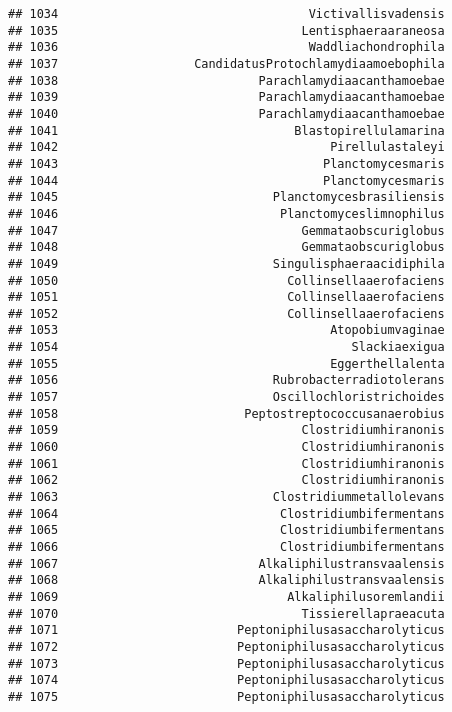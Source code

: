 \documentclass[
]{article}
\begin{document}
\begin{verbatim}
## 1034                                   Victivallisvadensis
## 1035                                  Lentisphaeraaraneosa
## 1036                                   Waddliachondrophila
## 1037                   CandidatusProtochlamydiaamoebophila
## 1038                            Parachlamydiaacanthamoebae
## 1039                            Parachlamydiaacanthamoebae
## 1040                            Parachlamydiaacanthamoebae
## 1041                                 Blastopirellulamarina
## 1042                                      Pirellulastaleyi
## 1043                                     Planctomycesmaris
## 1044                                     Planctomycesmaris
## 1045                              Planctomycesbrasiliensis
## 1046                               Planctomyceslimnophilus
## 1047                                  Gemmataobscuriglobus
## 1048                                  Gemmataobscuriglobus
## 1049                              Singulisphaeraacidiphila
## 1050                                Collinsellaaerofaciens
## 1051                                Collinsellaaerofaciens
## 1052                                Collinsellaaerofaciens
## 1053                                      Atopobiumvaginae
## 1054                                         Slackiaexigua
## 1055                                      Eggerthellalenta
## 1056                              Rubrobacterradiotolerans
## 1057                              Oscillochloristrichoides
## 1058                          Peptostreptococcusanaerobius
## 1059                                  Clostridiumhiranonis
## 1060                                  Clostridiumhiranonis
## 1061                                  Clostridiumhiranonis
## 1062                                  Clostridiumhiranonis
## 1063                              Clostridiummetallolevans
## 1064                               Clostridiumbifermentans
## 1065                               Clostridiumbifermentans
## 1066                               Clostridiumbifermentans
## 1067                            Alkaliphilustransvaalensis
## 1068                            Alkaliphilustransvaalensis
## 1069                                Alkaliphilusoremlandii
## 1070                                  Tissierellapraeacuta
## 1071                         Peptoniphilusasaccharolyticus
## 1072                         Peptoniphilusasaccharolyticus
## 1073                         Peptoniphilusasaccharolyticus
## 1074                         Peptoniphilusasaccharolyticus
## 1075                         Peptoniphilusasaccharolyticus

\end{verbatim}
\end{document}
